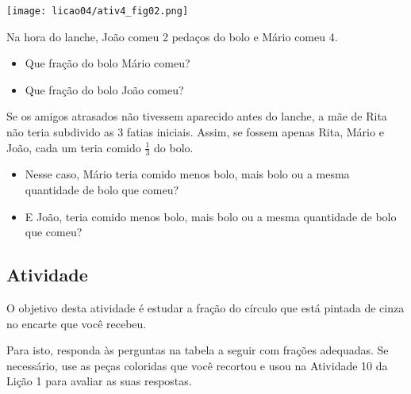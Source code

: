 \begin{center}
\texttt{[image: licao04/ativ4\_fig02.png]}
\end{center}



Na hora do lanche, João comeu 2 pedaços do bolo e Mário comeu 4.
\begin{itemize} %
  \item     Que fração do bolo Mário comeu?
  \item     Que fração do bolo João comeu?
\end{itemize} %

Se os amigos atrasados não tivessem aparecido antes do lanche, a mãe de Rita não teria subdivido as 3 fatias iniciais. Assim, se fossem apenas Rita, Mário e João, cada um teria comido $\frac{1}{3}$ do bolo.
\begin{itemize} %
  \item     Nesse caso, Mário teria comido menos bolo, mais bolo ou a mesma quantidade de bolo que comeu?
  \item     E João, teria comido menos bolo, mais bolo ou a mesma quantidade de bolo que comeu?
\end{itemize} %


\subsection{Atividade}

O objetivo desta atividade é estudar a fração do círculo que está pintada de cinza no encarte que você recebeu.

\begin{center}
\end{center}

Para isto, responda às perguntas na tabela a seguir com frações adequadas. Se necessário, use as peças coloridas que você recortou e usou na Atividade 10 da Lição 1 para avaliar as suas respostas.

